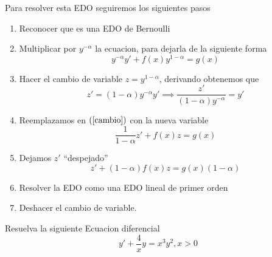 \documentclass[a4paper,oneside,10.5pt]{article}
\begin{document}
Para resolver esta EDO seguiremos los siguientes pasos
\begin{enumerate}
  \item Reconocer que es una EDO de Bernoulli
  \item Multiplicar por $y^{-\alpha}$ la ecuacion, para dejarla de la siguiente forma
        \begin{equation*}
          \label{cambio}
          y^{-\alpha}y' + f(x)y^{1 - \alpha} = g(x)
        \end{equation*}
  \item Hacer el cambio de variable $z = y^{1 - \alpha}$, derivando obtenemos que
        \begin{equation*}
          z' = (1 - \alpha)y^{-\alpha}y' \implies \frac{z'}{(1 - \alpha)y^{-\alpha}} = y'
        \end{equation*}
  \item Reemplazamos en $(\ref{cambio})$ con la nueva variable
        \begin{equation*}
          \frac{1}{1 - \alpha} z' + f(x)z = g(x)
        \end{equation*}
  \item Dejamos $z'$ ``despejado''
        \begin{equation*}
          z' + (1 - \alpha) f(x) z = g(x)(1 - \alpha)
        \end{equation*}
  \item Resolver la EDO como una EDO lineal de primer orden
  \item Deshacer el cambio de variable.
\end{enumerate}

\begin{ejemplo}
  Resuelva la siguiente Ecuacion diferencial
  \begin{equation*}
    y' + \frac{4}{x}y = x^{3}y^{2}, x > 0
  \end{equation*}
\end{ejemplo}
\end{document}
